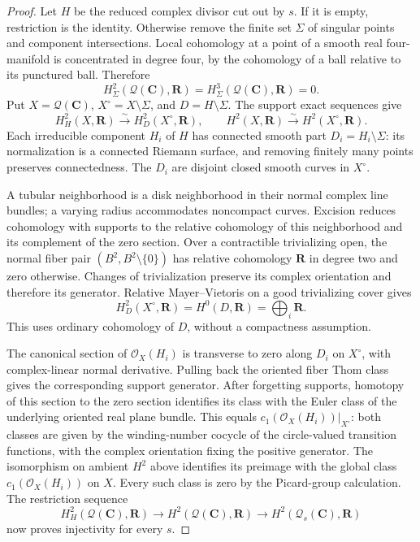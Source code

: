 \documentclass[11pt,a4paper]{amsart}
\numberwithin{equation}{section}
\theoremstyle{definition}
\theoremstyle{remark}
\newcommand{\DtwoRR}{\mathbf{R}}
\newcommand{\DtwoCC}{\mathbf{C}}
\newcommand{\DtwocO}{\mathcal O}
\newcommand{\DtwocQ}{\mathcal Q}
\begin{document}
\begin{proof}
Let \(H\) be the reduced complex divisor cut out by \(s\).
If it is empty, restriction is the identity.
Otherwise remove the finite set \(\Sigma\) of singular points and
component intersections.
Local cohomology at a point of a smooth real four-manifold is
concentrated in degree four, by the cohomology of a ball relative to
its punctured ball. Therefore
\[
 H^2_\Sigma(\DtwocQ(\DtwoCC),\DtwoRR)
 =H^3_\Sigma(\DtwocQ(\DtwoCC),\DtwoRR)=0.
\]
Put \(X=\DtwocQ(\DtwoCC)\), \(X^\circ=X\setminus\Sigma\), and
\(D=H\setminus\Sigma\). The support exact sequences give
\[
 H^2_H(X,\DtwoRR)\xrightarrow{\sim}H^2_D(X^\circ,\DtwoRR),
 \qquad
 H^2(X,\DtwoRR)\xrightarrow{\sim}H^2(X^\circ,\DtwoRR).
\]
Each irreducible component \(H_i\) of \(H\) has connected smooth
part \(D_i=H_i\setminus\Sigma\): its normalization is a connected
Riemann surface, and removing finitely many points preserves
connectedness. The \(D_i\) are disjoint closed smooth curves in
\(X^\circ\).

A tubular neighborhood is a disk neighborhood in their normal
complex line bundles; a varying radius accommodates noncompact
curves. Excision reduces cohomology with supports to the relative
cohomology of this neighborhood and its complement of the zero
section. Over a contractible trivializing open, the normal fiber
pair \((B^2,B^2\setminus\{0\})\) has relative cohomology
\(\DtwoRR\) in degree two and zero otherwise.
Changes of trivialization preserve its complex orientation and
therefore its generator. Relative Mayer--Vietoris on a good
trivializing cover gives
\[
 H^2_D(X^\circ,\DtwoRR)=H^0(D,\DtwoRR)
       =\bigoplus_i\DtwoRR.
\]
This uses ordinary cohomology of \(D\), without a compactness
assumption.

The canonical section of \(\DtwocO_X(H_i)\) is transverse to zero
along \(D_i\) on \(X^\circ\), with complex-linear normal derivative.
Pulling back the oriented fiber Thom class gives the corresponding
support generator. After forgetting supports, homotopy of this
section to the zero section identifies its class with the Euler
class of the underlying oriented real plane bundle. This equals
\(c_1(\DtwocO_X(H_i))|_{X^\circ}\): both classes are given by the
winding-number cocycle of the circle-valued transition functions,
with the complex orientation fixing the positive generator.
The isomorphism on ambient \(H^2\) above identifies its preimage
with the global class \(c_1(\DtwocO_X(H_i))\) on \(X\).
Every such class is zero by the Picard-group calculation.
The restriction sequence
\[
 H^2_H(\DtwocQ(\DtwoCC),\DtwoRR)\longrightarrow H^2(\DtwocQ(\DtwoCC),\DtwoRR)
 \longrightarrow H^2(\DtwocQ_s(\DtwoCC),\DtwoRR)
\]
now proves injectivity for every \(s\).
\end{proof}
\end{document}
